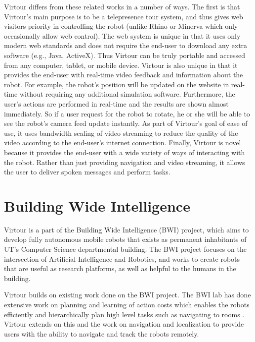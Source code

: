 \documentclass[
  oneside,
  11pt, a4paper,
  footinclude=true,
  headinclude=true,
  cleardoublepage=empty
]{article}
\begin{document}
Virtour differs from these related works in a number of ways. The first is that
Virtour's main purpose is to be a telepresence tour system, and thus gives web
visitors priority in controlling the robot (unlike Rhino or Minerva which only
occasionally allow web control). The web system is unique in that it uses only
modern web standards and does not require the end-user to download any extra
software (e.g., Java, ActiveX). Thus Virtour can be truly portable and accessed
from any computer, tablet, or mobile device. Virtour is also unique in that it
provides the end-user with real-time video feedback and information about the
robot. For example, the robot's position will be updated on the website in
real-time without requiring any additional simulation software. Furthermore,
the user's actions are performed in real-time and the results are shown almost
immediately. So if a user request for the robot to rotate, he or she will be
able to see the robot's camera feed update instantly. As part of Virtour's
goal of ease of use, it uses bandwidth scaling of video streaming to reduce the
quality of the video according to the end-user's internet connection. Finally,
Virtour is novel because it provides the end-user with a wide variety of ways
of interacting with the robot. Rather than just providing navigation and video
streaming, it allows the user to deliver spoken messages and perform tasks.

\section{Building Wide Intelligence}\label{sec:bwi}

Virtour is a part of the Building Wide Intelligence (BWI) project, which aims
to develop fully autonomous mobile robots that exists as permanent inhabitants
of UT's Computer Science departmental building. The BWI project focuses on the
intersection of Artificial Intelligence and Robotics, and works to create
robots that are useful as research platforms, as well as helpful to the humans
in the building.

Virtour builds on existing work done on the BWI project. The BWI lab has done
extensive work on planning and learning of action costs which enables the
robots efficiently and hierarchically plan high level tasks such as navigating
to rooms \citep{yang2014, khandelwal2014}. Virtour extends on this and the work
on navigation and localization to provide users with the ability to navigate
and track the robots remotely.
\end{document}
